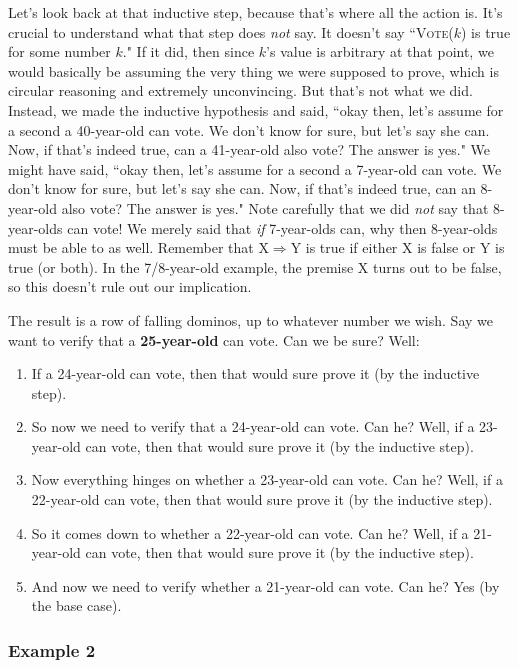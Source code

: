 Let's look back at that inductive step, because that's where all the action
is. It's crucial to understand what that step does \textit{not} say. It
doesn't say ``\textsc{Vote}($k$) is true for some number $k$." If it did,
then since $k$'s value is arbitrary at that point, we would basically be
assuming the very thing we were supposed to prove, which is circular
reasoning and extremely unconvincing. But that's not what we did. Instead,
we made the inductive hypothesis and said, ``okay then, let's assume for a
second a 40-year-old can vote. We don't know for sure, but let's say she
can. Now, if that's indeed true, can a 41-year-old also vote? The answer is
yes." We might have said, ``okay then, let's assume for a second a
7-year-old can vote. We don't know for sure, but let's say she can. Now, if
that's indeed true, can an 8-year-old also vote? The answer is yes." Note
carefully that we did \textit{not} say that 8-year-olds can vote! We merely
said that \textit{if} 7-year-olds can, why then 8-year-olds must be able to
as well. Remember that X$\Rightarrow$Y is true if either X is false or Y is
true (or both). In the 7/8-year-old example, the premise X turns out to be
false, so this doesn't rule out our implication.

The result is a row of falling dominos, up to whatever number we wish. Say
we want to verify that a \textbf{25-year-old} can vote. Can we be sure? Well:
\begin{enumerate}
\item If a 24-year-old can vote, then that would sure prove it (by the
inductive step).
\item So now we need to verify that a 24-year-old can vote. Can he? Well,
if a 23-year-old can vote, then that would sure prove it (by the inductive
step).
\item Now everything hinges on whether a 23-year-old can vote. Can he? Well,
if a 22-year-old can vote, then that would sure prove it (by the inductive
step).
\item So it comes down to whether a 22-year-old can vote. Can he? Well,
if a 21-year-old can vote, then that would sure prove it (by the inductive
step).
\item And now we need to verify whether a 21-year-old can vote. Can he? Yes
(by the base case).
\end{enumerate}

\subsubsection{Example 2}


